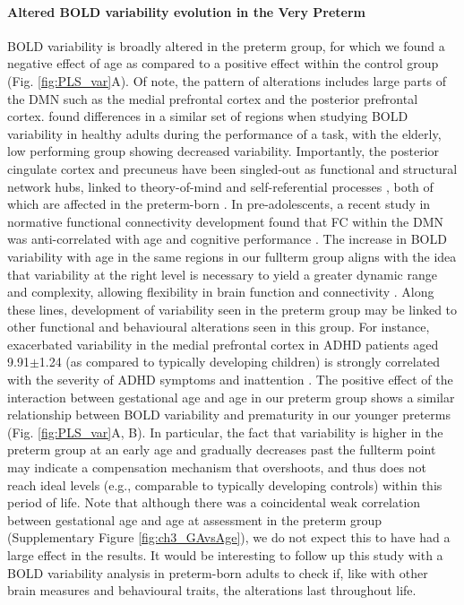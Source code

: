 \paragraph{Altered BOLD variability evolution in the Very Preterm}
BOLD variability is broadly altered in the preterm group, for which we found a negative effect of age as compared to a positive effect within the control group (Fig. \ref{fig:PLS_var}A). Of note, the pattern of alterations includes large parts of the DMN such as the medial prefrontal cortex and the posterior prefrontal cortex. \cite{Garrett2011} found differences in a similar set of regions when studying BOLD variability in healthy adults during the performance of a task, with the elderly, low performing group showing decreased variability. Importantly, the posterior cingulate cortex and precuneus have been singled-out as functional and structural network hubs, linked to theory-of-mind and self-referential processes \citep{Spreng2009,VandenHeuvel2013}, both of which are affected in the preterm-born \citep{Papini2016,Witt2018}. In pre-adolescents, a recent study in normative functional connectivity development found that FC within the DMN was anti-correlated with age and cognitive performance \citep{Jiang2018}. The increase in BOLD variability with age in the same regions in our fullterm group aligns with the idea that variability at the right level is necessary to yield a greater dynamic range and complexity, allowing flexibility in brain function and connectivity \citep{McIntosh2010,Deco2011,Garrett2013b}.
Along these lines, development of variability seen in the preterm group may be linked to other functional and behavioural alterations seen in this group. For instance, exacerbated variability in the medial prefrontal cortex in ADHD patients aged 9.91$\pm$1.24 (as compared to typically developing children) is strongly correlated with the severity of ADHD symptoms and inattention \citep{Nomi2018}. The positive effect of the interaction between gestational age and age in our preterm group shows a similar relationship between BOLD variability and prematurity in our younger preterms (Fig. \ref{fig:PLS_var}A, B). In particular, the fact that variability is higher in the preterm group at an early age and gradually decreases past the fullterm point may indicate a compensation mechanism that overshoots, and thus does not reach ideal levels (e.g., comparable to typically developing controls) within this period of life. Note that although there was a coincidental weak correlation between gestational age and age at assessment in the preterm group (Supplementary Figure \ref{fig:ch3_GAvsAge}), we do not expect this to have had a large effect in the results. It would be interesting to follow up this study with a BOLD variability analysis in preterm-born adults to check if, like with other brain measures and behavioural traits, the alterations last throughout life.


